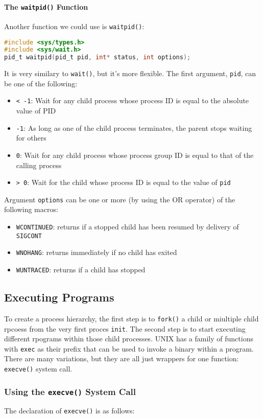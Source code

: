 \documentclass{article}
\renewcommand{\b}{\item[$\circ$]}
\newcommand{\newlist}{\begin{itemize}}
\renewcommand{\endlist}{\end{itemize}}
\newcommand{\code}[1]{\texttt{#1}}
\begin{document}
\paragraph{The \code{waitpid()} Function}

Another function we could use is \code{waitpid()}:

\begin{lstlisting}[language=c]
#include <sys/types.h>
#include <sys/wait.h>
pid_t waitpid(pid_t pid, int* status, int options);
\end{lstlisting}

It is very similary to \code{wait()}, but it's more flexible. The first argument, \code{pid}, can be one of the following:

\newlist
\b \code{< -1}: Wait for any child process whose process ID is equal to the absolute value of PID
\b \code{-1}: As long as one of the child process terminates, the parent stops waiting for others
\b \code{0}: Wait for any child process whose process group ID is equal to that of the calling process
\b \code{> 0}: Wait for the child whose process ID is equal to the value of \code{pid}
\endlist

Argument \code{options} can be one or more (by using the OR operator) of the following macros:

\newlist
\b \code{WCONTINUED}: returns if a stopped child has been resumed by delivery of \code{SIGCONT}
\b \code{WNOHANG}: returns immediately if no child has exited
\b \code{WUNTRACED}: returns if a child has stopped
\endlist

\subsection{Executing Programs}

To create a process hierarchy, the first step is to \code{fork()} a child or miultiple child rpcoess from the very first proces \code{init}. The second step is to start executing different rpograms within those child processes. UNIX has a family of functions with \code{exec} as their prefix that can be used to invoke a binary within a program. There are many variations, but they are all just wrappers for one function: \code{execve()} system call. 

\subsubsection{Using the \code{execve()} System Call}

The declaration of \code{execve()} is as follows:
\end{document}
